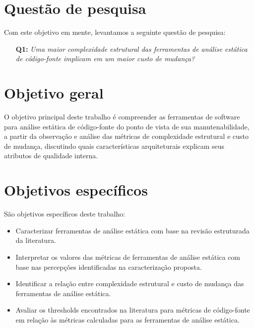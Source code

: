 \section{Questão de pesquisa}

Com este objetivo em mente, levantamos a seguinte questão de pesquisa:

\begin{enumerate}
  \item [{\bf Q1:}] {\em Uma maior complexidade estrutural das ferramentas de
  análise estática de código-fonte implicam em um maior custo de mudança?}
\end{enumerate}

\section{Objetivo geral}

O objetivo principal deste trabalho é compreender as ferramentas de software
para análise estática de código-fonte do ponto de vista de sua
manutenabilidade, a partir da observação e análise das métricas de complexidade
estrutural e custo de mudança, discutindo quais características arquiteturais
explicam seus atributos de qualidade interna.

\section{Objetivos específicos}

São objetivos específicos deste trabalho:

\begin{itemize}
  \item Caracterizar ferramentas de análise estática com base na revisão
        estruturada da literatura.
  \item Interpretar os valores das métricas de ferramentas de análise estática
        com base nas percepções identificadas na caracterização proposta.
  \item Identificar a relação entre complexidade estrutural e custo de mudança 
        das ferramentas de análise estática.
  \item Avaliar os thresholds encontrados na literatura para métricas de
        código-fonte em relação às métricas calculadas para as ferramentas
        de análise estática.
\end{itemize}

